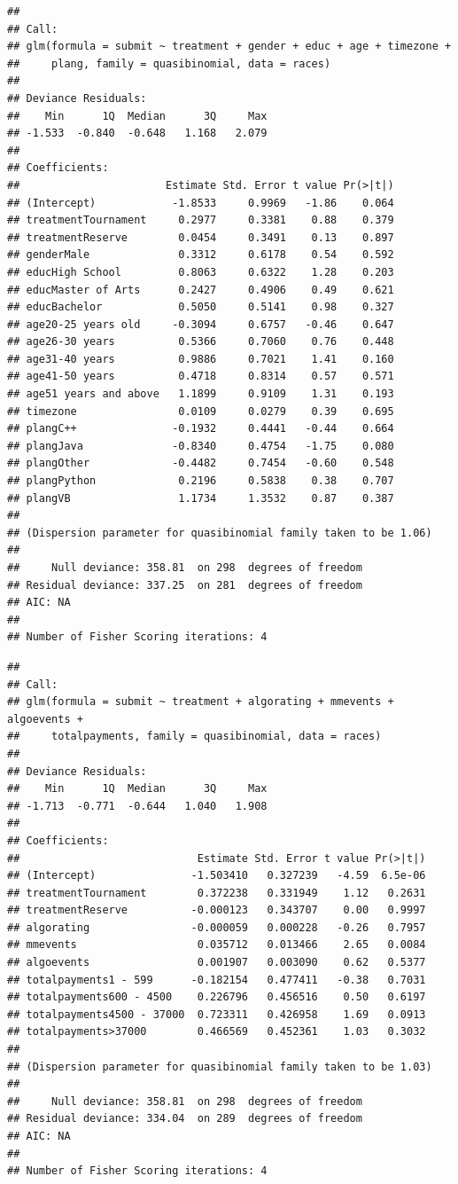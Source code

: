 \documentclass[12pt,]{article}
\theoremstyle{plain} %
\begin{document}
\begin{verbatim}
## 
## Call:
## glm(formula = submit ~ treatment + gender + educ + age + timezone + 
##     plang, family = quasibinomial, data = races)
## 
## Deviance Residuals: 
##    Min      1Q  Median      3Q     Max  
## -1.533  -0.840  -0.648   1.168   2.079  
## 
## Coefficients:
##                       Estimate Std. Error t value Pr(>|t|)
## (Intercept)            -1.8533     0.9969   -1.86    0.064
## treatmentTournament     0.2977     0.3381    0.88    0.379
## treatmentReserve        0.0454     0.3491    0.13    0.897
## genderMale              0.3312     0.6178    0.54    0.592
## educHigh School         0.8063     0.6322    1.28    0.203
## educMaster of Arts      0.2427     0.4906    0.49    0.621
## educBachelor            0.5050     0.5141    0.98    0.327
## age20-25 years old     -0.3094     0.6757   -0.46    0.647
## age26-30 years          0.5366     0.7060    0.76    0.448
## age31-40 years          0.9886     0.7021    1.41    0.160
## age41-50 years          0.4718     0.8314    0.57    0.571
## age51 years and above   1.1899     0.9109    1.31    0.193
## timezone                0.0109     0.0279    0.39    0.695
## plangC++               -0.1932     0.4441   -0.44    0.664
## plangJava              -0.8340     0.4754   -1.75    0.080
## plangOther             -0.4482     0.7454   -0.60    0.548
## plangPython             0.2196     0.5838    0.38    0.707
## plangVB                 1.1734     1.3532    0.87    0.387
## 
## (Dispersion parameter for quasibinomial family taken to be 1.06)
## 
##     Null deviance: 358.81  on 298  degrees of freedom
## Residual deviance: 337.25  on 281  degrees of freedom
## AIC: NA
## 
## Number of Fisher Scoring iterations: 4
\end{verbatim}

\begin{verbatim}
## 
## Call:
## glm(formula = submit ~ treatment + algorating + mmevents + algoevents + 
##     totalpayments, family = quasibinomial, data = races)
## 
## Deviance Residuals: 
##    Min      1Q  Median      3Q     Max  
## -1.713  -0.771  -0.644   1.040   1.908  
## 
## Coefficients:
##                            Estimate Std. Error t value Pr(>|t|)
## (Intercept)               -1.503410   0.327239   -4.59  6.5e-06
## treatmentTournament        0.372238   0.331949    1.12   0.2631
## treatmentReserve          -0.000123   0.343707    0.00   0.9997
## algorating                -0.000059   0.000228   -0.26   0.7957
## mmevents                   0.035712   0.013466    2.65   0.0084
## algoevents                 0.001907   0.003090    0.62   0.5377
## totalpayments1 - 599      -0.182154   0.477411   -0.38   0.7031
## totalpayments600 - 4500    0.226796   0.456516    0.50   0.6197
## totalpayments4500 - 37000  0.723311   0.426958    1.69   0.0913
## totalpayments>37000        0.466569   0.452361    1.03   0.3032
## 
## (Dispersion parameter for quasibinomial family taken to be 1.03)
## 
##     Null deviance: 358.81  on 298  degrees of freedom
## Residual deviance: 334.04  on 289  degrees of freedom
## AIC: NA
## 
## Number of Fisher Scoring iterations: 4
\end{verbatim}
\end{document}
